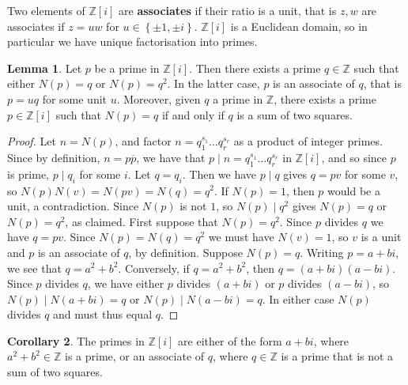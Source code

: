 \documentclass{article}
\newcommand{\Z}{\mathbb{Z}}
\newcommand{\rb}[1]{\left( #1 \right)}
\renewcommand{\sb}[1]{\left[ #1 \right]}
\newcommand{\cb}[1]{\left\{ #1 \right\}}
\theoremstyle{definition}\newtheorem{definition}{Definition}
\theoremstyle{definition}\newtheorem{remark}[definition]{Remark}
\theoremstyle{definition}\newtheorem*{example}{Example}
\theoremstyle{definition}\newtheorem*{note}{Note}
\newtheorem{lemma}[definition]{Lemma}
\newtheorem{corollary}[definition]{Corollary}
\begin{document}

Two elements of $ \Z\sb{i} $ are \textbf{associates} if their ratio is a unit, that is $ z, w $ are associates if $ z = uw $ for $ u \in \cb{\pm 1, \pm i} $. $ \Z\sb{i} $ is a Euclidean domain, so in particular we have unique factorisation into primes.

\begin{lemma}
Let $ p $ be a prime in $ \Z\sb{i} $. Then there exists a prime $ q \in \Z $ such that either $ N\rb{p} = q $ or $ N\rb{p} = q^2 $. In the latter case, $ p $ is an associate of $ q $, that is $ p = uq $ for some unit $ u $. Moreover, given $ q $ a prime in $ \Z $, there exists a prime $ p \in \Z\sb{i} $ such that $ N\rb{p} = q $ if and only if $ q $ is a sum of two squares.
\end{lemma}

\begin{proof}
Let $ n = N\rb{p} $, and factor $ n = q_1^{s_1} \dots q_r^{s_r} $ as a product of integer primes. Since by definition, $ n = p\overline{p} $, we have that $ p \mid n = q_1^{s_1} \dots q_r^{s_r} $ in $ \Z\sb{i} $, and so since $ p $ is prime, $ p \mid q_i $ for some $ i $. Let $ q = q_i $. Then we have $ p \mid q $ gives $ q = pv $ for some $ v $, so $ N\rb{p}N\rb{v} = N\rb{pv} = N\rb{q} = q^2 $. If $ N\rb{p} = 1 $, then $ p $ would be a unit, a contradiction. Since $ N\rb{p} $ is not $ 1 $, so $ N\rb{p} \mid q^2 $ gives $ N\rb{p} = q $ or $ N\rb{p} = q^2 $, as claimed. First suppose that $ N\rb{p} = q^2 $. Since $ p $ divides $ q $ we have $ q = pv $. Since $ N\rb{p} = N\rb{q} = q^2 $ we must have $ N\rb{v} = 1 $, so $ v $ is a unit and $ p $ is an associate of $ q $, by definition. Suppose $ N\rb{p} = q $. Writing $ p = a + bi $, we see that $ q = a^2 + b^2 $. Conversely, if $ q = a^2 + b^2 $, then $ q = \rb{a + bi}\rb{a - bi} $. Since $ p $ divides $ q $, we have either $ p $ divides $ \rb{a + bi} $ or $ p $ divides $ \rb{a - bi} $, so $ N\rb{p} \mid N\rb{a + bi} = q $ or $ N\rb{p} \mid N\rb{a - bi} = q $. In either case $ N\rb{p} $ divides $ q $ and must thus equal $ q $.
\end{proof}

\begin{corollary}
\label{cor:50}
The primes in $ \Z\sb{i} $ are either of the form $ a + bi $, where $ a^2 + b^2 \in \Z $ is a prime, or an associate of $ q $, where $ q \in \Z $ is a prime that is not a sum of two squares.
\end{corollary}
\end{document}
